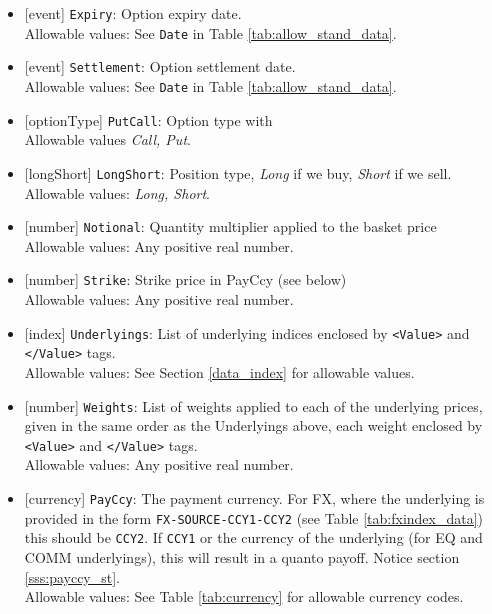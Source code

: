 \begin{itemize}
    \item{}[event] \lstinline!Expiry!: Option expiry date. \\
    Allowable values: See \lstinline!Date! in Table \ref{tab:allow_stand_data}.
    \item{}[event] \lstinline!Settlement!: Option settlement date. \\
    Allowable values: See \lstinline!Date! in Table \ref{tab:allow_stand_data}.
    \item{}[optionType] \lstinline!PutCall!: Option type with \\
          Allowable values \emph{Call, Put}.
    \item{}[longShort] \lstinline!LongShort!: Position type,
          {\em Long} if we buy, {\em Short} if we sell.\\
    Allowable values: \emph{Long, Short}.
        \item{}[number] \lstinline!Notional!: Quantity multiplier applied to the
          basket price \\
          Allowable values: Any positive real number.
        \item{}[number] \lstinline!Strike!: Strike price in PayCcy (see
          below) \\
          Allowable values: Any positive real number.
    \item{}[index] \lstinline!Underlyings!: List of underlying indices
          enclosed by {\tt <Value>} and {\tt </Value>} tags. \\
          Allowable values: See Section \ref{data_index} for allowable values.
    \item{}[number] \lstinline!Weights!: List of weights applied to each of
          the underlying prices, given in the same order as
          the Underlyings above, each weight enclosed by {\tt <Value>} and {\tt </Value>} tags.\\
          Allowable values: Any positive real number.
      \item{}[currency] \lstinline!PayCcy!: The payment currency. For FX, where the underlying is provided
      in the form \lstinline!FX-SOURCE-CCY1-CCY2! (see Table \ref{tab:fxindex_data}) this should
      be \lstinline!CCY2!. If \lstinline!CCY1! or the currency of the underlying (for EQ and
      COMM underlyings), this will result in a quanto payoff. Notice section \ref{sss:payccy_st}. \\
        Allowable values: See Table \ref{tab:currency} for allowable currency codes.
\end{itemize}


